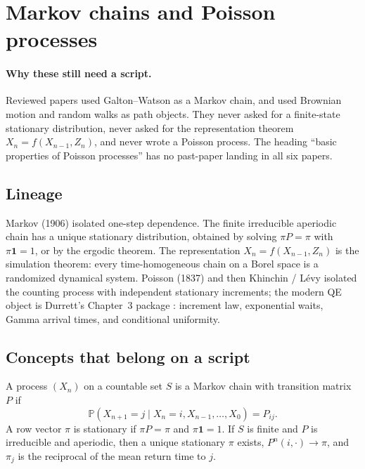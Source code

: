\section{Markov chains and Poisson processes}
\label{sec:stoch}

\paragraph{Why these still need a script.}
Reviewed papers used Galton--Watson as a Markov chain, and used Brownian motion and random walks as path objects. They never asked for a finite-state stationary distribution, never asked for the representation theorem \(X_{n}=f(X_{n-1},Z_{n})\), and never wrote a Poisson process. The heading ``basic properties of Poisson processes'' has no past-paper landing in all six papers.

\subsection{Lineage}

Markov (1906) isolated one-step dependence. The finite irreducible aperiodic chain has a unique stationary distribution, obtained by solving \(\pi P=\pi\) with \(\pi\mathbf{1}=1\), or by the ergodic theorem. The representation \(X_{n}=f(X_{n-1},Z_{n})\) is the simulation theorem: every time-homogeneous chain on a Borel space is a randomized dynamical system. Poisson (1837) and then Khinchin / L\'evy isolated the counting process with independent stationary increments; the modern QE object is Durrett's Chapter~3 package \cite{durrett10}: increment law, exponential waits, Gamma arrival times, and conditional uniformity.

\subsection{Concepts that belong on a script}

\begin{definition}
\label{def:mc}
A process \((X_{n})\) on a countable set \(S\) is a Markov chain with transition matrix \(P\) if
\[
\mathbb{P}(X_{n+1}=j\mid X_{n}=i,X_{n-1},\ldots,X_{0})=P_{ij}.
\]
A row vector \(\pi\) is stationary if \(\pi P=\pi\) and \(\pi\mathbf{1}=1\). If \(S\) is finite and \(P\) is irreducible and aperiodic, then a unique stationary \(\pi\) exists, \(P^{n}(i,\cdot)\to\pi\), and \(\pi_{j}\) is the reciprocal of the mean return time to \(j\).
\end{definition}

